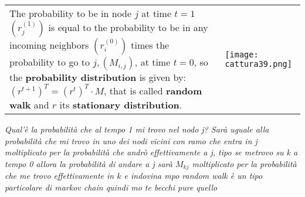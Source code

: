 \documentclass{article}
\begin{document}
\begin{tabular}{L{10cm} C{5cm}}
The probability to be in node $j$ at time $t=1$ $(r_j^{(1)})$ is equal to the probability to be in any incoming neighbors $(r_i^{(0)})$ times the probability to go to $j, (M_{i,j})$, at time $t=0$, so the \textbf{probability distribution} is given by: $(r^{t+1})^T = (r^{t})^T \cdot M$, that is called \textbf{random walk} and $r$ its \textbf{stationary distribution}. 
& \texttt{[image: cattura39.png]} 
\end{tabular}
\emph{Qual'è la probabilità che al tempo 1 mi trovo nel nodo j? Sarà uguale alla probabilità che mi trovo in uno dei nodi vicini con ramo che entra in j moltiplicato per la probabilità che andrò effettivamente a j, tipo se metrovo su k a tempo 0 allora la probabilità di andare a j sarà $M_{kj}$ moltiplicato per la probabilità che me trovo effettivamente in $k$ e indovina mpo random walk è un tipo particolare di markov chain quindi mo te becchi pure quello} 
\end{document}
